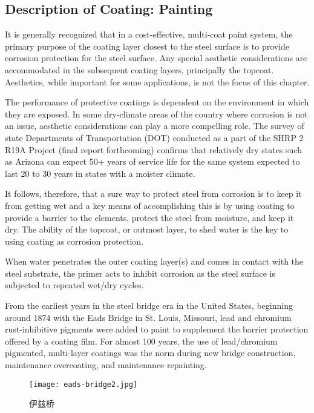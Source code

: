 \subsection{Description of Coating: Painting}
It is generally recognized that in a cost-effective, multi-coat paint system, the primary purpose of the coating layer closest to the steel surface is to provide corrosion protection for the steel surface. Any special aesthetic considerations are accommodated in the subsequent coating layers, principally the topcoat. Aesthetics, while important for some applications, is not the focus of this chapter.

The performance of protective coatings is dependent on the environment in which they are exposed. In some dry-climate areas of the country where corrosion is not an issue, aesthetic considerations can play a more compelling role. The survey of state Departments of Transportation (DOT) conducted as a part of the SHRP 2 R19A Project (final report forthcoming) confirms that relatively dry states such as Arizona can expect 50+ years of service life for the same system expected to last 20 to 30 years in states with a moister climate.

It follows, therefore, that a sure way to protect steel from corrosion is to keep it from getting wet and a key means of accomplishing this is by using coating to provide a barrier to the elements, protect the steel from moisture, and keep it dry. The ability of the topcoat, or outmost layer, to shed water is the key to using coating as corrosion protection.

When water penetrates the outer coating layer(s) and comes in contact with the steel substrate, the primer acts to inhibit corrosion as the steel surface is subjected to repeated wet/dry cycles.

From the earliest years in the steel bridge era in the United States, beginning around 1874 with the Eads Bridge in St. Louis, Missouri, lead and chromium rust-inhibitive pigments were added to paint to supplement the barrier protection offered by a coating film. For almost 100 years, the use of lead/chromium pigmented, multi-layer coatings was the norm during new bridge construction, maintenance overcoating, and maintenance repainting.

\begin{figure}
  \texttt{[image: eads-bridge2.jpg]}
  \caption{伊兹桥}
  \label{fig:eads-bridge2}
\end{figure}


